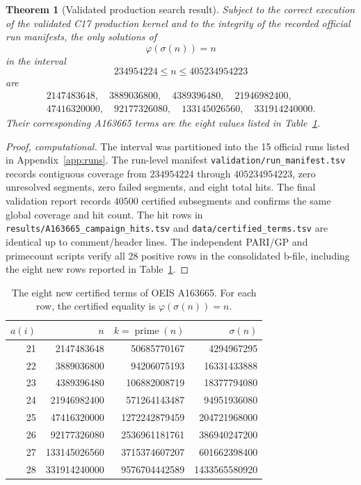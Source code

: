 \documentclass[11pt]{article}
\newtheorem{theorem}{Theorem}
\theoremstyle{definition}
\theoremstyle{remark}
\newcommand{\seqid}{A163665}
\begin{document}
\begin{theorem}[Validated production search result]
\label{thm:main}
Subject to the correct execution of the validated C17 production kernel
and to the integrity of the recorded official run manifests, the only
solutions of
\[
  \varphi(\sigma(n))=n
\]
in the interval
\[
  234954224 \leq n \leq 405234954223
\]
are
\[
\begin{gathered}
2147483648,\quad 3889036800,\quad 4389396480,\quad
21946982400,\\
47416320000,\quad 92177326080,\quad 133145026560,\quad
331914240000.
\end{gathered}
\]
Their corresponding \seqid{} terms are the eight values listed in
Table~\ref{tab:newterms}.
\end{theorem}

\begin{proof}[Proof, computational]
The interval was partitioned into the 15 official runs listed in
Appendix~\ref{app:runs}.  The run-level manifest
\texttt{validation/run\_manifest.tsv} records contiguous coverage from
\(234954224\) through \(405234954223\), zero unresolved segments, zero
failed segments, and eight total hits.  The final validation report
records \(40500\) certified subsegments and confirms the same global
coverage and hit count.  The hit rows in
\texttt{results/A163665\_campaign\_hits.tsv} and
\texttt{data/certified\_terms.tsv} are identical up to comment/header
lines.  The independent PARI/GP and primecount scripts verify all 28
positive rows in the consolidated b-file, including the eight new rows
reported in Table~\ref{tab:newterms}.
\end{proof}

\begin{table}[ht]
\centering
\begin{tabular}{rrrr}
\toprule
\(a(i)\) & \(n\) & \(k=\operatorname{prime}(n)\) & \(\sigma(n)\)\\
\midrule
21 & 2147483648 & 50685770167 & 4294967295\\
22 & 3889036800 & 94206075193 & 16331433888\\
23 & 4389396480 & 106882008719 & 18377794080\\
24 & 21946982400 & 571264143487 & 94951936080\\
25 & 47416320000 & 1272242879459 & 204721968000\\
26 & 92177326080 & 2536961181761 & 386940247200\\
27 & 133145026560 & 3715374607207 & 601662398400\\
28 & 331914240000 & 9576704442589 & 1433565580920\\
\bottomrule
\end{tabular}
\caption{The eight new certified terms of OEIS \seqid{}.  For each row,
the certified equality is \(\varphi(\sigma(n))=n\).}
\label{tab:newterms}
\end{table}
\end{document}
